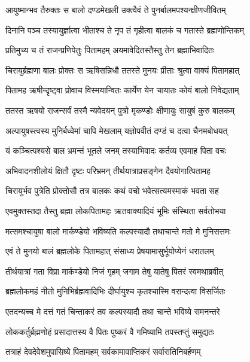 \twolineshloka
{आयुष्मान्भव तैरुक्तः स बालो दण्डमेखली}
{उक्त्वैवं ते पुनर्बालमपश्यन्क्षीणजीवितम्} %

\twolineshloka
{दिनानि पञ्च तस्यायुर्ज्ञात्वा भीताश्च ते नृप}
{तं गृहीत्वा बालकं च गतास्ते ब्रह्मणोन्तिकम्} %

\twolineshloka
{प्रतिमुच्य च तं राजन्प्रणिपेतुः पितामहम्}
{अयमावेदितस्तैस्तु तेन ब्रह्माभिवादितः} %

\twolineshloka
{चिरायुर्ब्रह्मणा बालः प्रोक्तः स ऋषिसन्निधौ}
{ततस्ते मुनयः प्रीताः श्रुत्वा वाक्यं पितामहात्} %

\twolineshloka
{पितामह ऋषीन्दृष्ट्वा प्रोवाच विस्मयान्वितः}
{कार्येण येन चायातः कोयं बालो निवेद्यताम्} %

\twolineshloka
{ततस्त ऋषयो राजन्सर्वं तस्मै न्यवेदयन्}
{पुत्रो मृकण्डोः क्षीणायुः सायुषं कुरु बालकम्} %

\twolineshloka
{अल्पायुषस्त्वस्य मुनिर्बध्वेमां चापि मेखलाम्}
{यज्ञोपवीतं दण्डं च दत्वा चैनमबोधयत्} %

\twolineshloka
{यं कञ्चित्पश्यसे बाल भ्रमन्तं भूतले जनम्}
{तस्याभिवादः कर्तव्य एवमाह पिता वचः} %

\twolineshloka
{अभिवादनशीलोयं क्षितौ दृष्टः परिभ्रमन्}
{तीर्थयात्राप्रसङ्गेन दैवयोगात्पितामह} %

\twolineshloka
{चिरायुर्भव पुत्रेति प्रोक्तोसौ तत्र बालकः}
{कथं वचो भवेत्सत्यमस्माकं भवता सह} %

\twolineshloka
{एवमुक्तस्तदा तैस्तु ब्रह्मा लोकपितामहः}
{ऋतवाक्यादियं भूमिः संस्थिता सर्वतोभया} %



\twolineshloka
{मत्समश्चायुषा बालो मार्कण्डेयो भविष्यति}
{कल्पस्यादौ तथाचान्ते मतो मे मुनिसत्तमः} %

\twolineshloka
{एवं ते मुनयो बालं ब्रह्मलोके पितामहात्}
{संसाध्य प्रेषयामासुर्भूयोप्येनं धरातलम्} %

\twolineshloka
{तीर्थयात्रां गता विप्रा मार्कण्डेयो निजं गृहम्}
{जगाम तेषु यातेषु पितरं स्वमथाब्रवीत्} %

\twolineshloka
{ब्रह्मलोकमहं नीतो मुनिभिर्ब्रह्मवादिभिः}
{दीर्घायुश्च कृतश्चास्मि वरान्दत्वा विसर्जितः} %

\twolineshloka
{एतदन्यच्च मे दत्तं गतं चिन्ताकरं तव}
{कल्पस्यादौ तथा चान्ते भविष्ये समनन्तरे} %

\twolineshloka
{लोककर्तुर्ब्रह्मणोहं प्रसादात्तस्य वै पितः}
{पुष्करं वै गमिष्यामि तपस्तप्तुं समुद्यतः} %

\twolineshloka
{तत्राहं देवदेवेशमुपासिष्ये पितामहम्}
{सर्वकामावाप्तिकरं सर्वारातिनिबर्हणम्} %

